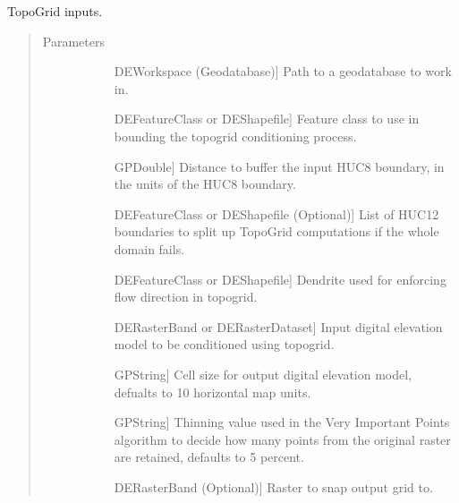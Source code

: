 \documentclass[letterpaper,10pt,english]{sphinxmanual}
\begin{document}
\begin{fulllineitems}
\begin{fulllineitems}
\label{\detokenize{StreamStats_DataPrep:StreamStats_DataPrep.TopoGrid.getParameterInfo}}
TopoGrid inputs.
\begin{quote}\begin{description}
\item[{Parameters}] \leavevmode\begin{description}
\item[{}] \leavevmode{[}DEWorkspace (Geodatabase){]}
Path to a geodatabase to work in.

\item[{}] \leavevmode{[}DEFeatureClass or DEShapefile{]}
Feature class to use in bounding the topogrid conditioning process.

\item[{}] \leavevmode{[}GPDouble{]}
Distance to buffer the input HUC8 boundary, in the units of the HUC8 boundary.

\item[{}] \leavevmode{[}DEFeatureClass or DEShapefile (Optional){]}
List of HUC12 boundaries to split up TopoGrid computations if the whole domain fails.

\item[{}] \leavevmode{[}DEFeatureClass or DEShapefile{]}
Dendrite used for enforcing flow direction in topogrid.

\item[{}] \leavevmode{[}DERasterBand or DERasterDataset{]}
Input digital elevation model to be conditioned using topogrid.

\item[{}] \leavevmode{[}GPString{]}
Cell size for output digital elevation model, defualts to 10 horizontal map units.

\item[{}] \leavevmode{[}GPString{]}
Thinning value used in the Very Important Points algorithm to decide how many points from the original raster are retained, defaults to 5 percent.

\item[{}] \leavevmode{[}DERasterBand (Optional){]}
Raster to snap output grid to.


\end{description}
\end{description}
\end{quote}
\end{fulllineitems}
\end{fulllineitems}
\end{document}
